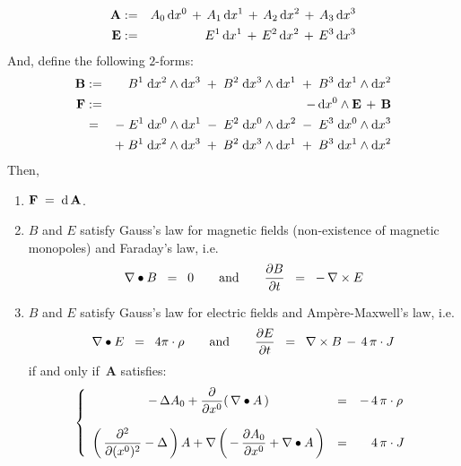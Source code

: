 \begin{theorem}
\begin{eqnarray*}
\\
\mathbf{A}
& := &
	A_{0}\,\textnormal{d} x^{0} \,+\, A_{1}\,\textnormal{d} x^{1}  \,+\, A_{2}\,\textnormal{d} x^{2}  \,+\, A_{3}\,\textnormal{d} x^{3}
\\
\mathbf{E}
& := &
	E^{1}\,\textnormal{d} x^{1} \,+\, E^{2}\,\textnormal{d} x^{2} \,+\, E^{3}\,\textnormal{d} x^{3}
\end{eqnarray*}
\vskip 0.3cm
\noindent
And, define the following $2$-forms:
\begin{eqnarray*}
\mathbf{B}
& := &
	B^{1}\;\textnormal{d} x^{2} \wedge \textnormal{d} x^{3}
	\;+\;
	B^{2}\;\textnormal{d} x^{3} \wedge \textnormal{d} x^{1}
	\;+\;
	B^{3}\;\textnormal{d} x^{1} \wedge \textnormal{d} x^{2}
\\
\mathbf{F}
& := &
	- \, \textnormal{d} x^{0} \wedge \mathbf{E} \, + \, \mathbf{B}
\\
& = &
	- \; E^{1}\;\textnormal{d} x^{0} \wedge \textnormal{d} x^{1} \; - \; E^{2}\;\textnormal{d} x^{0} \wedge \textnormal{d} x^{2} \; - \; E^{3}\;\textnormal{d} x^{0} \wedge \textnormal{d} x^{3}
\\
&&
	+\;
	B^{1}\;\textnormal{d} x^{2} \wedge \textnormal{d} x^{3}
	\;+\;
	B^{2}\;\textnormal{d} x^{3} \wedge \textnormal{d} x^{1}
	\;+\;
	B^{3}\;\textnormal{d} x^{1} \wedge \textnormal{d} x^{2}
\end{eqnarray*}
Then,
\begin{enumerate}
\item
	$\mathbf{F} \; = \; \textnormal{d}\,\mathbf{A}$.
\item
	$B$ and $E$ satisfy Gauss's law for magnetic fields (non-existence of magnetic monopoles) and Faraday's law, i.e.
	\begin{equation*}
	\nabla \bullet B \;\; = \;\; 0
	\quad\quad\textnormal{and}\quad\quad
	\dfrac{\partial B}{\partial t} \;\; = \;\; -\,\nabla \times E
	\end{equation*}	
\item	
	$B$ and $E$ satisfy Gauss's law for electric fields and Amp\`{e}re-Maxwell's law, i.e.
	\begin{equation*}
	\nabla \bullet E \;\; = \;\; 4 \pi \cdot \rho
	\quad\quad\textnormal{and}\quad\quad
	\dfrac{\partial E}{\partial t} \;\; = \;\; \nabla \times B \,-\, 4\,\pi\cdot J
	\end{equation*}
	if and only if \,$\mathbf{A}$ satisfies:
	\begin{equation*}
	\left\{\begin{array}{ccl}
		-\,\Delta A_{0} + \dfrac{\partial}{\partial x^{0}}\!\left(\,\nabla \bullet A\,\right)
		& = &
			- \, 4\,\pi\cdot\rho
		\\ \\
		\left(\,\dfrac{\partial^{2}}{\partial(x^{0})^{2}} - \Delta\,\right)A
		+
		\nabla\left(\, -\,\dfrac{\partial A_{0}}{\partial x^{0}} + \nabla \bullet A \,\right)
		& = &
			{\color{white}-} \, 4\,\pi \cdot J
		\end{array}\right.
	\end{equation*}
\end{enumerate}
\end{theorem}
